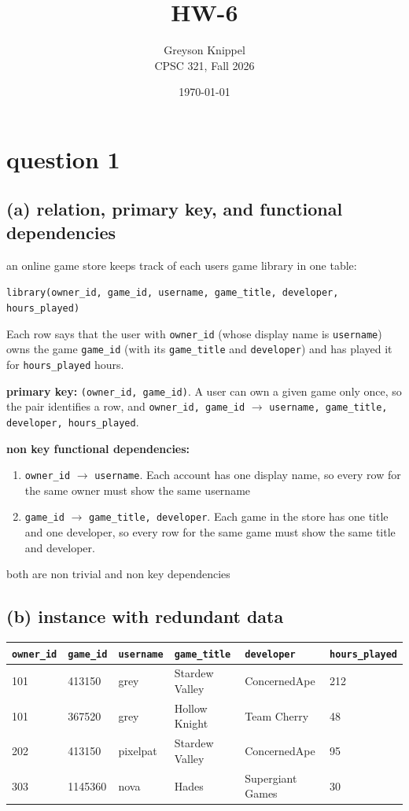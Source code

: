 \documentclass[11pt]{article}
\title{HW-6}
\author{
Greyson Knippel \\[4pt]
CPSC 321, Fall 2026\\[4pt]
}
\date{\today}
\newcommand{\at}[1]{\texttt{#1}}
\begin{document}
\maketitle

\section*{question 1}

\subsection*{(a) relation, primary key, and functional dependencies}

an online game store keeps track of each users game library in one table:
\begin{center}
\at{library(owner\_id, game\_id, username, game\_title, developer, hours\_played)}
\end{center}
Each row says that the user with \at{owner\_id} (whose display name is
\at{username}) owns the game \at{game\_id} (with its \at{game\_title} and
\at{developer}) and has played it for \at{hours\_played} hours.

\medskip
\noindent\textbf{primary key:} \at{(owner\_id, game\_id)}. A user can own a
given game only once, so the pair identifies a row, and
\at{owner\_id, game\_id} $\to$ \at{username, game\_title, developer,
hours\_played}. 

\medskip
\noindent\textbf{non key functional dependencies:}
\begin{enumerate}[label=FD\arabic*:, leftmargin=*]
  \item \at{owner\_id} $\to$ \at{username}. Each account has one display
    name, so every row for the same owner must show the same username
  \item \at{game\_id} $\to$ \at{game\_title, developer}. Each game in the
    store has one title and one developer, so every row for the same game
    must show the same title and developer.
\end{enumerate}
both are non trivial and non key dependencies

\subsection*{(b) instance with redundant data}

\begin{center}
\begin{tabular}{llllll}
\toprule
\at{owner\_id} & \at{game\_id} & \at{username} & \at{game\_title} & \at{developer} & \at{hours\_played} \\
\midrule
101 & 413150  & grey     & Stardew Valley & ConcernedApe     & 212 \\
101 & 367520  & grey     & Hollow Knight  & Team Cherry      & 48  \\
202 & 413150  & pixelpat & Stardew Valley & ConcernedApe     & 95  \\
303 & 1145360 & nova     & Hades          & Supergiant Games & 30  \\
\bottomrule
\end{tabular}
\end{center}
\end{document}
